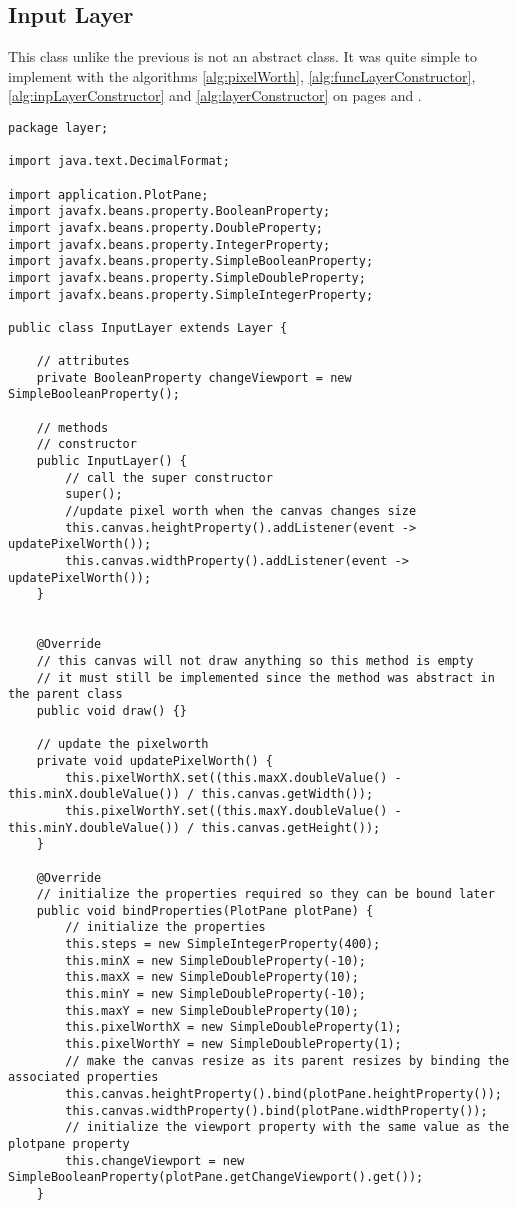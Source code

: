 \documentclass[../../../../main.tex]{subfiles}
\begin{document}
\subsection{Input Layer}
This class unlike the previous is not an abstract class. It was quite simple to implement with the algorithms \ref{alg:pixelWorth}, \ref{alg:funcLayerConstructor}, \ref{alg:inpLayerConstructor} and \ref{alg:layerConstructor} on pages \pageref{alg:pixelWorth} and \pageref{alg:funcLayerConstructor}.
\begin{verbatim}
package layer;

import java.text.DecimalFormat;

import application.PlotPane;
import javafx.beans.property.BooleanProperty;
import javafx.beans.property.DoubleProperty;
import javafx.beans.property.IntegerProperty;
import javafx.beans.property.SimpleBooleanProperty;
import javafx.beans.property.SimpleDoubleProperty;
import javafx.beans.property.SimpleIntegerProperty;

public class InputLayer extends Layer {
	
	// attributes
	private BooleanProperty changeViewport = new SimpleBooleanProperty();
	
	// methods
	// constructor
	public InputLayer() {
		// call the super constructor
		super();
		//update pixel worth when the canvas changes size
		this.canvas.heightProperty().addListener(event -> updatePixelWorth());
		this.canvas.widthProperty().addListener(event -> updatePixelWorth());
	}


	@Override
	// this canvas will not draw anything so this method is empty
	// it must still be implemented since the method was abstract in the parent class
	public void draw() {}
	
	// update the pixelworth
	private void updatePixelWorth() {
		this.pixelWorthX.set((this.maxX.doubleValue() - this.minX.doubleValue()) / this.canvas.getWidth());
		this.pixelWorthY.set((this.maxY.doubleValue() - this.minY.doubleValue()) / this.canvas.getHeight());
	}

	@Override
	// initialize the properties required so they can be bound later
	public void bindProperties(PlotPane plotPane) {
		// initialize the properties
		this.steps = new SimpleIntegerProperty(400);
		this.minX = new SimpleDoubleProperty(-10);
		this.maxX = new SimpleDoubleProperty(10);
		this.minY = new SimpleDoubleProperty(-10);
		this.maxY = new SimpleDoubleProperty(10);
		this.pixelWorthX = new SimpleDoubleProperty(1);
		this.pixelWorthY = new SimpleDoubleProperty(1);
		// make the canvas resize as its parent resizes by binding the associated properties
		this.canvas.heightProperty().bind(plotPane.heightProperty());
		this.canvas.widthProperty().bind(plotPane.widthProperty());
		// initialize the viewport property with the same value as the plotpane property
		this.changeViewport = new SimpleBooleanProperty(plotPane.getChangeViewport().get());
	}
	

\end{verbatim}
\end{document}
